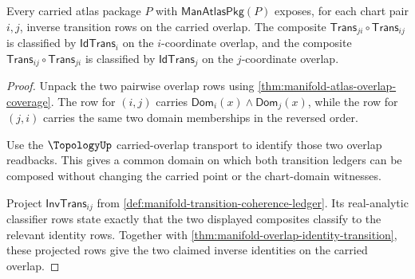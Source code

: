 \begin{theorem}
\label{thm:manifold-overlap-inverse-transition}
Every carried atlas package $P$ with $\mathsf{ManAtlasPkg}(P)$ exposes, for
each chart pair $i,j$, inverse transition rows on the carried overlap. The
composite $\mathsf{Trans}_{ji}\circ\mathsf{Trans}_{ij}$ is classified by
$\mathsf{IdTrans}_i$ on the $i$-coordinate overlap, and the composite
$\mathsf{Trans}_{ij}\circ\mathsf{Trans}_{ji}$ is classified by
$\mathsf{IdTrans}_j$ on the $j$-coordinate overlap.
\end{theorem}
\begin{proof}
Unpack the two pairwise overlap rows using
\autoref{thm:manifold-atlas-overlap-coverage}. The row for $(i,j)$ carries
$\mathsf{Dom}_i(x)\wedge\mathsf{Dom}_j(x)$, while the row for $(j,i)$ carries
the same two domain memberships in the reversed order.

Use the $\TopologyUp$ carried-overlap transport to identify those two overlap
readbacks. This gives a common domain on which both transition ledgers can be
composed without changing the carried point or the chart-domain witnesses.

Project $\mathsf{InvTrans}_{ij}$ from
\autoref{def:manifold-transition-coherence-ledger}. Its real-analytic
classifier rows state exactly that the two displayed composites classify to
the relevant identity rows. Together with
\autoref{thm:manifold-overlap-identity-transition}, these projected rows give
the two claimed inverse identities on the carried overlap.
\end{proof}

